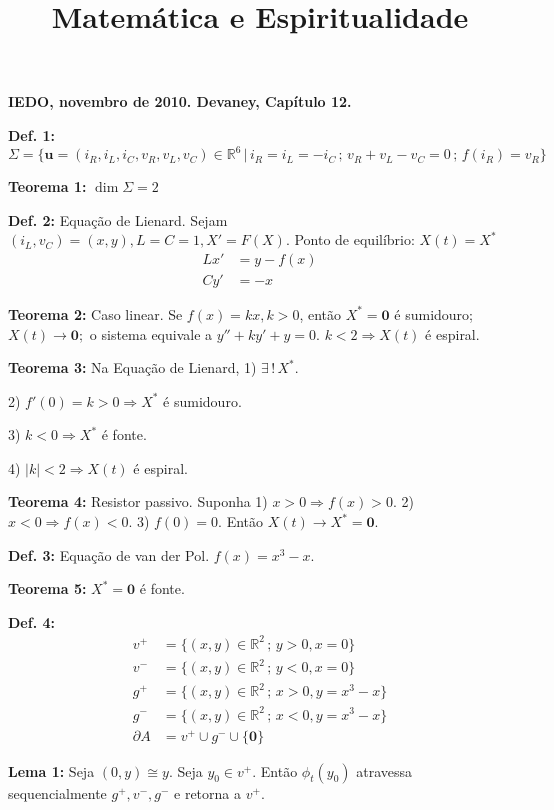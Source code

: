 \documentclass[10pt,a4paper]{article}
\title{Matem\'atica e Espiritualidade}
\date{}
\begin{document}
\textbf{IEDO, novembro de 2010. Devaney, Cap\'itulo 12.}

\begin{flushright}
\end{flushright}

\textbf{Def. 1:} $\Sigma = \{ \mathbf{u} = \left( i_R, i_L, i_C, v_R, v_L, v_C \right) \in \mathbb{R}^6 \,|\, i_R = i_L = - i_C \,;\, v_R + v_L - v_C = 0 \,;\, f(i_R) = v_R \}$

\textbf{Teorema 1:} $\dim \Sigma = 2$

\textbf{Def. 2:} Equa\c{c}\~ao de Lienard. Sejam $(i_L, v_C) = (x,y), L = C = 1, X' = F(X).$ Ponto de equil\'ibrio: $X(t) = X^*$
\begin{align*}
  Lx' &= y - f(x) \\
  Cy' &= -x
\end{align*}

\textbf{Teorema 2:} Caso linear. Se $f(x) = kx, k > 0$, ent\~ao $X^* = \mathbf{0}$ \'e sumidouro; $X(t) \rightarrow \mathbf{0};$ o sistema equivale a $y'' + ky' + y = 0$. $k < 2 \Rightarrow X(t)$ \'e espiral.

\textbf{Teorema 3:} Na Equa\c{c}\~ao de Lienard, 1) $\exists\,!\, X^*.$

2) $f'(0) = k > 0 \Rightarrow X^*$ \'e sumidouro.

3) $k < 0 \Rightarrow X^*$ \'e fonte.

4) $|k| < 2 \Rightarrow X(t)$ \'e espiral.

\textbf{Teorema 4:} Resistor passivo. Suponha 1) $x > 0 \Rightarrow f(x) > 0$.
2) $x < 0 \Rightarrow f(x) < 0$.
3) $f(0) = 0$. Ent\~ao $X(t) \rightarrow X^* = \mathbf{0}$.

\textbf{Def. 3:} Equa\c{c}\~ao de van der Pol. $f(x) = x^3 - x$.

\textbf{Teorema 5:} $X^* = \mathbf{0}$ \'e fonte.

\textbf{Def. 4:}
\begin{align*}
v^+ &= \{(x,y) \in \mathbb{R}^2 \,;\, y > 0, x = 0 \} \\
v^- &= \{(x,y) \in \mathbb{R}^2 \,;\, y < 0, x = 0 \} \\
g^+ &= \{(x,y) \in \mathbb{R}^2 \,;\, x > 0, y = x^3 - x \} \\
g^- &= \{(x,y) \in \mathbb{R}^2 \,;\, x < 0, y = x^3 - x \} \\
\partial A &= v^+ \cup g^- \cup \{ \mathbf{0} \}
\end{align*}

\textbf{Lema 1:} Seja $(0,y) \cong y$. Seja $y_0 \in v^+$. Ent\~ao $\phi_t(y_0)$ atravessa sequencialmente $g^+, v^-, g^-$ e retorna a $v^+$.
\end{document}
